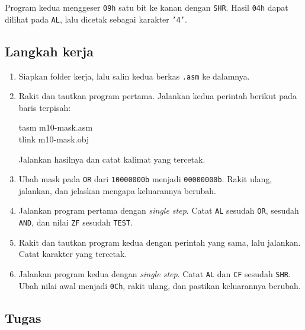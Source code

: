 Program kedua menggeser \texttt{09h} satu bit ke kanan dengan
\texttt{SHR}. Hasil \texttt{04h} dapat dilihat pada \texttt{AL},
lalu dicetak sebagai karakter \texttt{'4'}.



\subsection{Langkah kerja}

\begin{enumerate}
    \item Siapkan folder kerja, lalu salin kedua berkas \texttt{.asm}
          ke dalamnya.
    \item Rakit dan tautkan program pertama. Jalankan kedua perintah
          berikut pada baris terpisah:
          \begin{perintah}
tasm m10-mask.asm\\
tlink m10-mask.obj
\end{perintah}
          Jalankan hasilnya dan catat kalimat yang tercetak.
    \item Ubah mask pada \texttt{OR} dari \texttt{10000000b} menjadi
          \texttt{00000000b}. Rakit ulang, jalankan, dan jelaskan
          mengapa keluarannya berubah.
    \item Jalankan program pertama dengan \emph{single step}. Catat
          \texttt{AL} sesudah \texttt{OR}, sesudah \texttt{AND}, dan
          nilai \texttt{ZF} sesudah \texttt{TEST}.
    \item Rakit dan tautkan program kedua dengan perintah yang sama,
          lalu jalankan. Catat karakter yang tercetak.
    \item Jalankan program kedua dengan \emph{single step}. Catat
          \texttt{AL} dan \texttt{CF} sesudah \texttt{SHR}. Ubah
          nilai awal menjadi \texttt{0Ch}, rakit ulang, dan pastikan
          keluarannya berubah.
\end{enumerate}

\subsection{Tugas}

